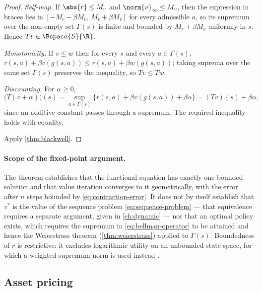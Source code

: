 \begin{proof}
	\emph{Self-map.} If $\abs{r}\leq M_r$ and $\norm{v}_\infty\leq M_v$, then the
	expression in braces lies in $[-M_r-\beta M_v,\,M_r+\beta M_v]$ for every
	admissible $a$, so its supremum over the non-empty set $\Gamma(s)$ is finite and
	bounded by $M_r+\beta M_v$ uniformly in $s$. Hence $Tv\in\Bspace{S}{\R}$.

	\emph{Monotonicity.} If $v\leq w$ then for every $s$ and every
	$a\in\Gamma(s)$, $r(s,a)+\beta v(g(s,a))\leq r(s,a)+\beta w(g(s,a))$; taking
	suprema over the same set $\Gamma(s)$ preserves the inequality, so
	$Tv\leq Tw$.

	\emph{Discounting.} For $\alpha\geq0$,
	\[
		\bigl(T(v+\alpha)\bigr)(s)
		=\sup_{a\in\Gamma(s)}\bigl\{r(s,a)+\beta v(g(s,a))+\beta\alpha\bigr\}
		=(Tv)(s)+\beta\alpha,
	\]
	since an additive constant passes through a supremum. The required inequality
	holds with equality.

	Apply \autoref{thm:blackwell}.
\end{proof}

\paragraph{Scope of the fixed-point argument.} The theorem establishes that the
functional equation has exactly one bounded solution and that value iteration
converges to it geometrically, with the error after $n$ steps bounded by
\eqref{eq:contraction-error}. It does not by itself establish that $v^\ast$ is
the value of the sequence problem \eqref{eq:sequence-problem} --- that
equivalence requires a separate argument, given in \autoref{ch:dynamic} --- nor
that an optimal policy exists, which requires the supremum in
\eqref{eq:bellman-operator} to be attained and hence the Weierstrass theorem
(\autoref{thm:weierstrass}) applied to $\Gamma(s)$. Boundedness of $r$ is
restrictive: it excludes logarithmic utility on an unbounded state space, for
which a weighted supremum norm is used instead
\autocite[Sec.~4.3]{stokey1989recursive}.

\subsection{Asset pricing}\label{subsec:comp-lucas}

